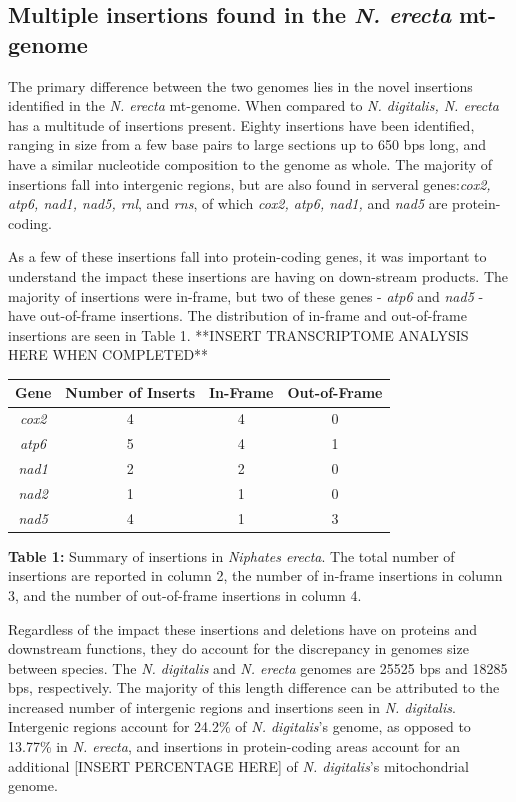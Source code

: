 \documentclass[../main.tex]{subfiles}
\begin{document}
\subsection{Multiple insertions found in the \emph{N. erecta} mt-genome}
The primary difference between the two genomes lies in the novel insertions identified in the \emph{N. erecta} mt-genome. When compared to \emph{N. digitalis, N. erecta} has a multitude of insertions present. Eighty insertions have been identified, ranging in size from a few base pairs to large sections up to 650 bps long, and have a similar nucleotide composition to the genome as whole. The majority of insertions fall into intergenic regions, but are also found in serveral genes:\emph{cox2, atp6, nad1, nad5, rnl}, and \emph{rns}, of which \emph{cox2, atp6, nad1,} and \emph{nad5} are protein-coding.

As a few of these insertions fall into protein-coding genes, it was important to understand the impact these insertions are having on down-stream products. The majority of insertions were in-frame, but two of these genes - \emph{atp6} and \emph{nad5} - have out-of-frame insertions. The distribution of in-frame and out-of-frame insertions are seen in Table 1. **INSERT TRANSCRIPTOME ANALYSIS HERE WHEN COMPLETED**

\begin{center}
\begin{tabular}{ |c|c|c|c| } 
 \hline
 \textbf{Gene}& \textbf{Number of Inserts} & \textbf{In-Frame} & \textbf{Out-of-Frame}\\
 \hline
 \emph{cox2}  & 4  & 4 & 0 \\
\hline
\emph{atp6} & 5 & 4 & 1 \\
\hline
\emph{nad1} & 2 & 2 & 0 \\
\hline
\emph{nad2} & 1 & 1 & 0 \\
\hline
\emph{nad5} & 4 & 1 & 3 \\
\hline
\end{tabular}

\caption{\textbf{Table 1:} Summary of insertions in \emph{Niphates erecta}. The total number of insertions are reported in column 2, the number of in-frame insertions in column 3, and the number of out-of-frame insertions in column 4.}
\end{center}

Regardless of the impact these insertions and deletions have on proteins and downstream functions, they do account for the discrepancy in genomes size between species. The \emph{N. digitalis} and \emph{N. erecta} genomes are 25525 bps and 18285 bps, respectively. The majority of this length difference can be attributed to the increased number of intergenic regions and insertions seen in \emph{N. digitalis}. Intergenic regions account for 24.2\% of \emph{N. digitalis}'s genome, as opposed to 13.77\% in \emph{N. erecta}, and insertions in protein-coding areas account for an additional [INSERT PERCENTAGE HERE] of \emph{N. digitalis}'s mitochondrial genome.
\end{document}
